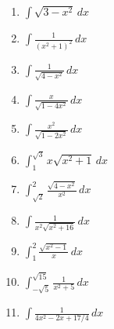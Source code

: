 \documentclass[12pt]{article}
\newif\ifans
\begin{document}
\begin{enumerate}

\item $\int \sqrt{3-x^2}\,dx$ 

\ifans{\fbox{$\frac{3}{2}\arcsin{\left(\frac{x}{\sqrt{3}}\right)}+\frac{1}{2}x\sqrt{3-x^2}+C$}} \fi

\item $\int \frac{1}{(x^2+1)^2}\,dx$ 

\ifans{\fbox{$\frac{1}{2}\tan^{-1}{x}+\frac{x}{2(x^2+1)}+C$}} \fi

\item $\int \frac{1}{\sqrt{4-x^2}}\,dx$ 

\ifans{\fbox{$\arcsin{\left(\frac{x}{2}\right)+C}$}} \fi

\item $\int \frac{x}{\sqrt{1-4x^2}}\,dx$ 

\ifans{\fbox{$-\frac{1}{4}\sqrt{1-4x^2}+C$}} \fi

\item $\int \frac{x^2}{\sqrt{1-2x^2}}\,dx$ 

\ifans{\fbox{$\frac{1}{4\sqrt{2}}\arcsin{(\sqrt{2}x)}-\frac{1}{4}x\sqrt{1-2x^2}+C$; Detailed Solution: \textcolor{blue}{\href{http://www.math.drexel.edu/classes/Calculus/resources/Math122HW/Solutions/122_16_Trig_Sub_05.pdf}{Here}}}} \fi

\item $\int^{\sqrt{3}}_1 x\sqrt{x^2+1}\,dx$ 

\ifans{\fbox{$\frac{1}{3}(8-2\sqrt{2})$}} \fi

\item $\int^2_{\sqrt{2}} \frac{\sqrt{4-x^2}}{x^2}\,dx$ 

\ifans{\fbox{$1-\frac{\pi}{4}$}} \fi

\item $\int \frac{1}{x^2\sqrt{x^2+16}}\,dx$ 

\ifans{\fbox{$-\frac{\sqrt{x^2+16}}{16x}+C$}} \fi

\item $\int_1^2 \frac{\sqrt{x^2-1}}{x}\,dx$ 

\ifans{\fbox{$\sqrt{3}-\frac{\pi}{3}$}} \fi

\item $\int_{-\sqrt{5}}^{\sqrt{15}} \frac{1}{x^2+5}\,dx$ 

\ifans{\fbox{$\frac{7\pi}{12\sqrt{5}}$}} \fi

\item $\int \frac{1}{4x^2-2x+17/4}\,dx$ 


\end{enumerate}
\end{document}
